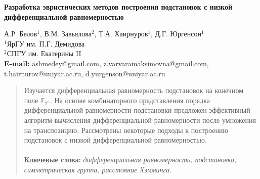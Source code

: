 \documentclass[a4paper,12pt]{article}
\def\titleK#1{\begin{center}{\textbf {#1}}\end{center}}
\def\authorK#1{\begin{center}{#1}\end{center}}
\newtheorem{lemma}{Лемма}
\theoremstyle{definition}
\newtheorem{theorem}{Теорема}
\newtheorem{corollary}{Следствие}
\newtheorem{proposition}{Предложение}
\theoremstyle{definition}
\newtheorem{definition}{Определение}
\theoremstyle{definition}
\newtheorem{question}{Вопрос}
\theoremstyle{definition}
\newtheorem{conjecture}{Гипотеза}
\begin{document}
\titleK{Разработка эвристических методов построения подстановок с низкой дифференциальной равномерностью}
\authorK{А.Р. Белов$^{1}$, В.М. Завьялова$^{2}$, Т.А. Хаирнуров$^{1}$, Д.Г. Юргенсон$^{1}$\\
$^{1}$ЯрГУ им. П.Г. Демидова \\$^{2}$СПГУ им. Екатерины II \\
{\bf E-mail:} ashmedey@gmail.com, z.varvaramaksimovna@gmail.com, t.hairnurov@uniyar.ac.ru, d.yurgenson@uniyar.ac.ru}
\begin{abstract}
      Изучается дифференциальная равномерность подстановок на конечном поле $\mathbb{F}_{2^n}$. На основе комбинаторного представления порядка дифференциальной равномерности подстановки предложен эффективный алгоритм вычисления дифференциальной равномерности после умножения на транспозицию. Рассмотрены некоторые подходы к построению подстановок с низкой дифференциальной равномерностью.\\
\\{\bf Ключевые слова:} \textit{ дифференциальная равномерность, подстановка, симметрическая группа, расстояние Хэмминга.} 
 \end{abstract}
\end{document}
